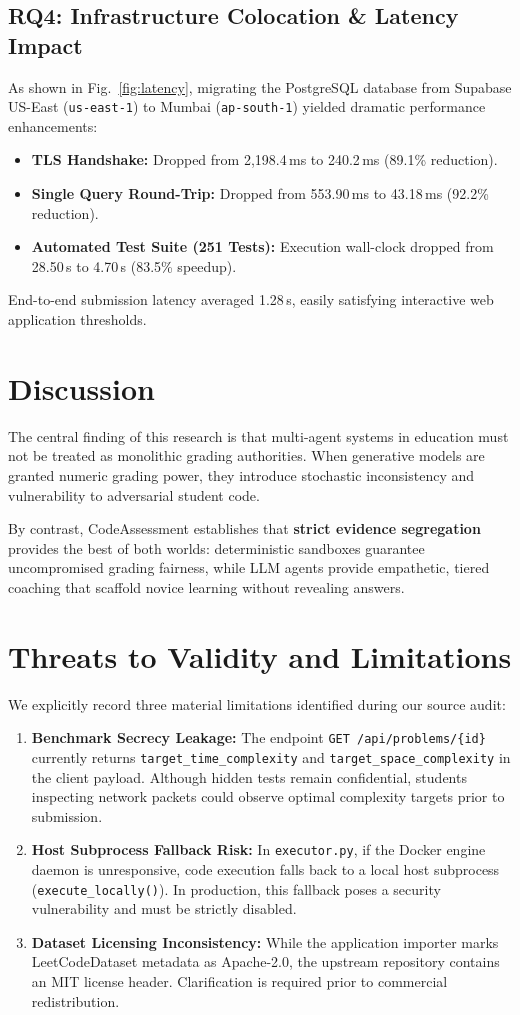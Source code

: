 \documentclass[conference]{IEEEtran}
\begin{document}
\subsection{RQ4: Infrastructure Colocation \& Latency Impact}
As shown in Fig.~\ref{fig:latency}, migrating the PostgreSQL database from Supabase US-East (\texttt{us-east-1}) to Mumbai (\texttt{ap-south-1}) yielded dramatic performance enhancements:
\begin{itemize}
    \item \textbf{TLS Handshake:} Dropped from 2,198.4\,ms to 240.2\,ms (89.1\% reduction).
    \item \textbf{Single Query Round-Trip:} Dropped from 553.90\,ms to 43.18\,ms (92.2\% reduction).
    \item \textbf{Automated Test Suite (251 Tests):} Execution wall-clock dropped from 28.50\,s to 4.70\,s (83.5\% speedup).
\end{itemize}
End-to-end submission latency averaged 1.28\,s, easily satisfying interactive web application thresholds.

\section{Discussion}
The central finding of this research is that multi-agent systems in education must not be treated as monolithic grading authorities. When generative models are granted numeric grading power, they introduce stochastic inconsistency and vulnerability to adversarial student code. 

By contrast, CodeAssessment establishes that \textbf{strict evidence segregation} provides the best of both worlds: deterministic sandboxes guarantee uncompromised grading fairness, while LLM agents provide empathetic, tiered coaching that scaffold novice learning without revealing answers.

\section{Threats to Validity and Limitations}
We explicitly record three material limitations identified during our source audit:
\begin{enumerate}
    \item \textbf{Benchmark Secrecy Leakage:} The endpoint \texttt{GET /api/problems/\{id\}} currently returns \texttt{target\_time\_complexity} and \texttt{target\_space\_complexity} in the client payload. Although hidden tests remain confidential, students inspecting network packets could observe optimal complexity targets prior to submission.
    \item \textbf{Host Subprocess Fallback Risk:} In \texttt{executor.py}, if the Docker engine daemon is unresponsive, code execution falls back to a local host subprocess (\texttt{execute\_locally()}). In production, this fallback poses a security vulnerability and must be strictly disabled.
    \item \textbf{Dataset Licensing Inconsistency:} While the application importer marks LeetCodeDataset metadata as Apache-2.0, the upstream repository contains an MIT license header. Clarification is required prior to commercial redistribution.
\end{enumerate}
\end{document}
